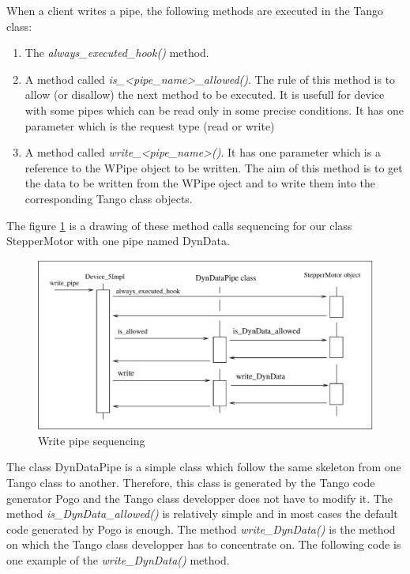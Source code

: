 When a client writes a pipe, the following methods are executed in
the Tango class:
\begin{enumerate}
\item The \emph{always\_executed\_hook()} method.
\item A method called \emph{is\_<pipe\_name>\_allowed()}. The rule of this
method is to allow (or disallow) the next method to be executed. It
is usefull for device with some pipes which can be read only in some
precise conditions. It has one parameter which is the request type
(read or write)
\item A method called \emph{write\_<pipe\_name>()}. It has one parameter
which is a reference to the WPipe object to be written. The aim of
this method is to get the data to be written from the WPipe oject
and to write them into the corresponding Tango class objects.
\end{enumerate}
The figure \ref{w_pipe_timing_fig-1-1} is a drawing of these method
calls sequencing for our class StepperMotor with one pipe named DynData.
\begin{figure}[H]
\begin{centering}
\includegraphics[scale=0.7]{ds_writing/w_pipe}
\par\end{centering}
\caption{Write pipe sequencing\label{w_pipe_timing_fig-1-1}}
\end{figure}

The class DynDataPipe is a simple class which follow the same skeleton
from one Tango class to another. Therefore, this class is generated
by the Tango code generator Pogo and the Tango class developper does
not have to modify it. The method \emph{is\_DynData\_allowed()} is
relatively simple and in most cases the default code generated by
Pogo is enough. The method \emph{write\_DynData()} is the method on
which the Tango class developper has to concentrate on. The following
code is one example of the \emph{write\_DynData()} method.

